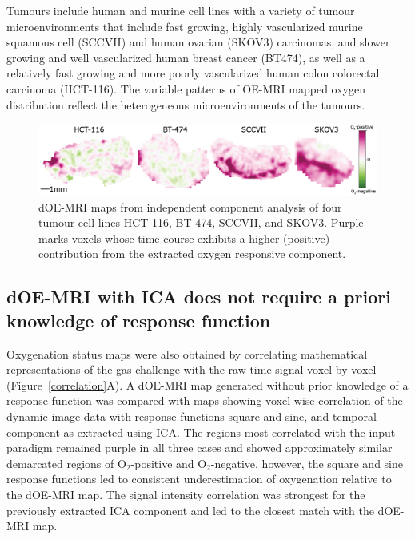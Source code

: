 Tumours include human and murine cell lines with a variety of tumour microenvironments that include fast growing, highly vascularized murine squamous cell (SCCVII) and human ovarian (SKOV3) carcinomas, and slower growing and well vascularized human breast cancer (BT474), as well as a relatively fast growing and more poorly vascularized human colon colorectal carcinoma (HCT-116).
The variable patterns of OE-MRI mapped oxygen distribution reflect the heterogeneous microenvironments of the tumours.


\begin{figure}[htbp]
   \centering
   \includegraphics[width=\textwidth]{oemri/oemri-images/oemri_versatile.png} %
   \caption{dOE-MRI maps from independent component analysis of four tumour cell lines HCT-116, BT-474, SCCVII, and SKOV3.
Purple marks voxels whose time course exhibits a higher (positive) contribution from the extracted oxygen responsive component.}
   \label{versatile}
\end{figure}

\subsection{dOE-MRI with ICA does not require a priori knowledge of response function}

Oxygenation status maps were also obtained by correlating mathematical representations of the gas challenge with the raw time-signal voxel-by-voxel (Figure~\ref{correlation}A).
A dOE-MRI map generated without prior knowledge of a response function was compared with maps showing voxel-wise correlation of the dynamic image data with response functions square and sine, and temporal component as extracted using ICA.
The regions most correlated with the input paradigm remained purple in all three cases and showed approximately similar demarcated regions of O$_2$-positive and O$_2$-negative, however, the square and sine response functions led to consistent underestimation of oxygenation relative to the dOE-MRI map.
The signal intensity correlation was strongest for the previously extracted ICA component and led to the closest match with the dOE-MRI map.

